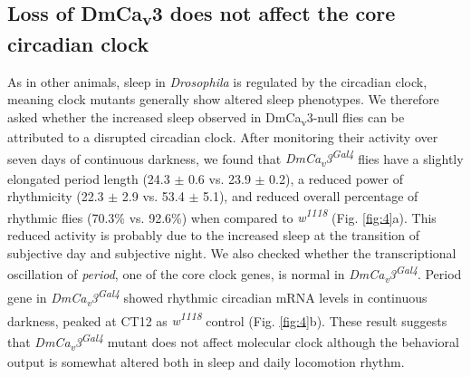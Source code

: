 \subsection*{Loss of DmCa\textsubscript{v}3 does not affect the core circadian clock}

As in other animals, sleep in \emph{Drosophila} is regulated by the circadian clock, meaning clock mutants generally show altered sleep phenotypes\cite{hendricks:2003aa, parisky:2008aa}.
We therefore asked whether the increased sleep observed in DmCa\textsubscript{v}3-null flies can be attributed to a disrupted circadian clock.
After monitoring their activity over seven days of continuous darkness, we found that \emph{DmCa\textsubscript{v}3\textsuperscript{Gal4}} flies have a slightly elongated period length (24.3 $\pm$ 0.6 vs. 23.9 $\pm$ 0.2), a reduced power of rhythmicity (22.3 $\pm$ 2.9 vs. 53.4 $\pm$ 5.1), and reduced overall percentage of rhythmic flies (70.3\% vs. 92.6\%) when compared to \emph{w\textsuperscript{1118}} (Fig. \ref{fig:4}a).
This reduced activity is probably due to the increased sleep at the transition of subjective day and subjective night.
We also checked whether the transcriptional oscillation of \emph{period}, one of the core clock genes, is normal in \emph{DmCa\textsubscript{v}3\textsuperscript{Gal4}}. 
Period gene in \emph{DmCa\textsubscript{v}3\textsuperscript{Gal4}} showed rhythmic circadian mRNA levels in continuous darkness, peaked at CT12 as \emph{w\textsuperscript{1118}} control (Fig. \ref{fig:4}b).
These result suggests that \emph{DmCa\textsubscript{v}3\textsuperscript{Gal4}} mutant does not affect molecular clock although the behavioral output is somewhat altered both in sleep and daily locomotion rhythm. 


  